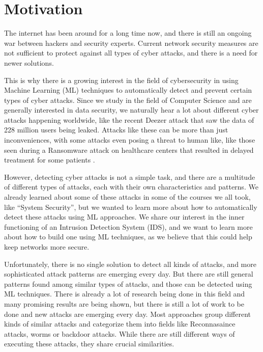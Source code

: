 \section{Motivation}
The internet has been around for a long time now, and there is still an ongoing war between hackers and security experts. 
Current network security measures are not sufficient to protect against all types of cyber attacks, and there is a need for newer solutions.

\nextparagraph
This is why there is a growing interest in the field of cybersecurity in using Machine Learning (ML) techniques to automatically detect and prevent certain types of cyber attacks. Since we study in the field of Computer Science and are generally interested in data security, we naturally hear a lot about different cyber attacks happening worldwide, like the recent Deezer attack \cite{purplesec_deezer_data_leak} that saw the data of 228 million users being leaked. Attacks like these can be more than just inconveniences, with some attacks even posing a threat to human like, like those seen during a Ransomware attack on healthcare centers that resulted in delayed treatment for some patients \cite{medical_data_breach}. 

\nextparagraph
However, detecting cyber attacks is not a simple task, and there are a multitude of different types of attacks, each with their own characteristics and patterns. We already learned about some of these attacks in some of the courses we all took, like ``System Security'', but we wanted to learn more about how to automatically detect these attacks using ML approaches. We share our interest in the inner functioning of an Intrusion Detection System (IDS), and we want to learn more about how to build one using ML techniques, as we believe that this could help keep networks more secure.

\nextparagraph
Unfortunately, there is no single solution to detect all kinds of attacks, and more sophisticated attack patterns are emerging every day. But there are still general patterns found among similar types of attacks, and those can be detected using ML techniques. There is already a lot of research being done in this field and many promising results are being shown, but there is still a lot of work to be done and new attacks are emerging every day. Most approaches group different kinds of similar attacks and categorize them into fields like Reconnasaince attacks, worms or backdoor attacks. While there are still different ways of executing these attacks, they share crucial similarities. 

